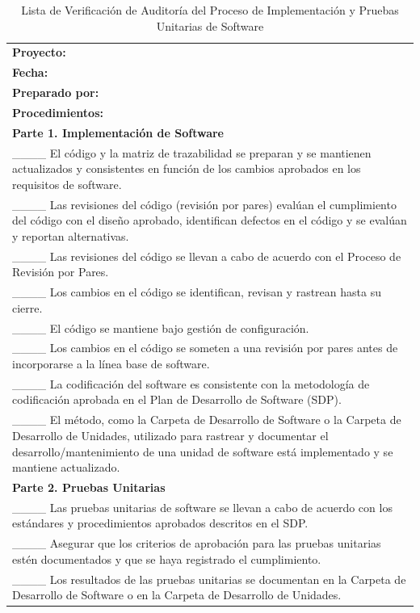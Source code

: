 \begin{table}[H]
\centering
\caption{Lista de Verificación de Auditoría del Proceso de Implementación y Pruebas Unitarias de Software}
\label{fig:b7}
\begin{tabular}{|p{14cm}|}
\hline
\textbf{Proyecto:} \\
\textbf{Fecha:} \\
\textbf{Preparado por:} \\
\hline
\textbf{Procedimientos:} \\
\textbf{Parte 1. Implementación de Software} \\
\_\_\_\_ El código y la matriz de trazabilidad se preparan y se mantienen actualizados y consistentes en función de los cambios aprobados en los requisitos de software. \\
\_\_\_\_ Las revisiones del código (revisión por pares) evalúan el cumplimiento del código con el diseño aprobado, identifican defectos en el código y se evalúan y reportan alternativas. \\
\_\_\_\_ Las revisiones del código se llevan a cabo de acuerdo con el Proceso de Revisión por Pares. \\
\_\_\_\_ Los cambios en el código se identifican, revisan y rastrean hasta su cierre. \\
\_\_\_\_ El código se mantiene bajo gestión de configuración. \\
\_\_\_\_ Los cambios en el código se someten a una revisión por pares antes de incorporarse a la línea base de software. \\
\_\_\_\_ La codificación del software es consistente con la metodología de codificación aprobada en el Plan de Desarrollo de Software (SDP). \\
\_\_\_\_ El método, como la Carpeta de Desarrollo de Software o la Carpeta de Desarrollo de Unidades, utilizado para rastrear y documentar el desarrollo/mantenimiento de una unidad de software está implementado y se mantiene actualizado. \\
\textbf{Parte 2. Pruebas Unitarias} \\
\_\_\_\_ Las pruebas unitarias de software se llevan a cabo de acuerdo con los estándares y procedimientos aprobados descritos en el SDP. \\
\_\_\_\_ Asegurar que los criterios de aprobación para las pruebas unitarias estén documentados y que se haya registrado el cumplimiento. \\
\_\_\_\_ Los resultados de las pruebas unitarias se documentan en la Carpeta de Desarrollo de Software o en la Carpeta de Desarrollo de Unidades. \\
\hline
\end{tabular}
\end{table}

